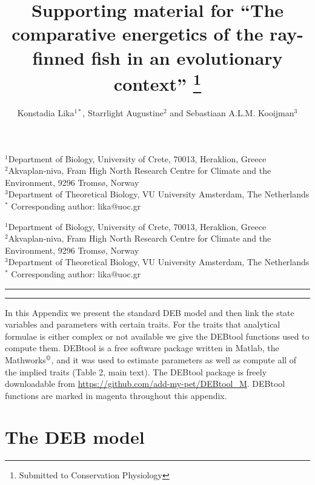 \documentclass{article}
\begin{document}
\date{}

\title{Supporting material for  ``The comparative energetics of the ray-finned fish in an evolutionary context''
\footnote{Submitted to Conservation Physiology}}

\author{
        Konstadia Lika$^{1\ast}$,       
        Starrlight Augustine$^2$ and  
        Sebastiaan A.L.M. Kooijman$^3$ 
       }

\maketitle
\noindent
{\small
{$^1$Department of Biology, University of Crete, 70013, Heraklion, Greece}\\
{$^2$Akvaplan-niva, Fram High North Research Centre for Climate and the Environment, 9296 Troms\o, Norway}\\
{$^3$Department of Theoretical Biology, VU University Amsterdam, The Netherlands}\\
{$^\ast$ Corresponding author: lika@uoc.gr}
}

\noindent
{\small
{$^1$Department of Biology, University of Crete, 70013, Heraklion, Greece}\\
{$^2$Akvaplan-niva, Fram High North Research Centre for Climate and the Environment, 9296 Troms\o, Norway}\\
{$^3$Department of Theoretical Biology, VU University Amsterdam, The Netherlands}\\
{$^\ast$ Corresponding author: lika@uoc.gr}
}
\vspace{2cm}
\hrule
\vspace{0.3cm}\hrule
\vspace{1cm}

In this Appendix we present the standard DEB model and then link the state variables and parameters with certain traits. For the traits that analytical formulae is either complex or not available we give the DEBtool functions used to compute them.
DEBtool \citep{DEBtool2022} is a free software package  written in  Matlab, the Mathworks$^{\copyright}$, and it was used to estimate parameters as well as compute all of the implied traits (Table 2, main text).
The DEBtool package is freely downloadable from \url{https://github.com/add-my-pet/DEBtool_M}.
DEBtool functions are marked in magenta throughout this appendix.


\section{The DEB model}
\end{document}

